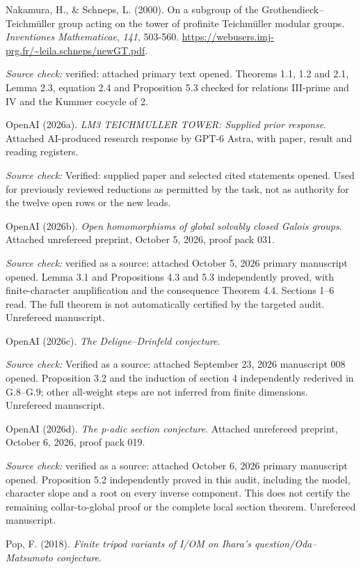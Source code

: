 \documentclass[10pt,a4paper]{article}
\begin{document}
Nakamura, H., \& Schneps, L. (2000). On a subgroup of the Grothendieck--Teichm\"{u}ller group acting on the tower of profinite Teichm\"{u}ller modular groups. \emph{Inventiones Mathematicae}, \emph{141}, 503-560. \url{https://webusers.imj-prg.fr/~leila.schneps/newGT.pdf}.

\emph{Source check:} verified: attached primary text opened. Theorems 1.1, 1.2 and 2.1, Lemma 2.3, equation 2.4 and Proposition 5.3 checked for relations III-prime and IV and the Kummer cocycle of 2.

OpenAI (2026a). \emph{LM3 TEICHMULLER TOWER: Supplied prior response}. Attached AI-produced research response by GPT-6 Astra, with paper, result and reading registers.

\emph{Source check:} Verified: supplied paper and selected cited statements opened. Used for previously reviewed reductions as permitted by the task, not as authority for the twelve open rows or the new leads.

OpenAI (2026b). \emph{Open homomorphisms of global solvably closed Galois groups}. Attached unrefereed preprint, October 5, 2026, proof pack 031.

\emph{Source check:} verified as a source: attached October 5, 2026 primary manuscript opened. Lemma 3.1 and Propositions 4.3 and 5.3 independently proved, with finite-character amplification and the consequence Theorem 4.4. Sections 1--6 read. The full theorem is not automatically certified by the targeted audit. Unrefereed manuscript.

OpenAI (2026c). \emph{The Deligne--Drinfeld conjecture}.

\emph{Source check:} Verified as a source: attached September 23, 2026 manuscript 008 opened. Proposition 3.2 and the induction of section 4 independently rederived in G.8--G.9; other all-weight steps are not inferred from finite dimensions. Unrefereed manuscript.

OpenAI (2026d). \emph{The p-adic section conjecture}. Attached unrefereed preprint, October 6, 2026, proof pack 019.

\emph{Source check:} verified as a source: attached October 6, 2026 primary manuscript opened. Proposition 5.2 independently proved in this audit, including the model, character slope and a root on every inverse component. This does not certify the remaining collar-to-global proof or the complete local section theorem. Unrefereed manuscript.

Pop, F. (2018). \emph{Finite tripod variants of I/OM on Ihara's question/Oda--Matsumoto conjecture}.
\end{document}
